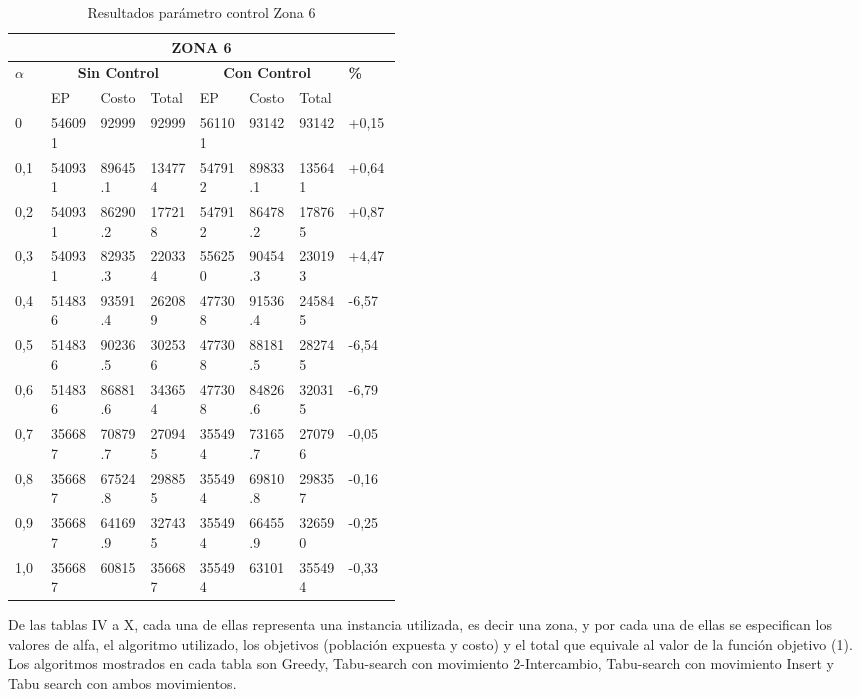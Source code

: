 \documentclass[conference]{IEEEtran}
\begin{document}
\begin{table*}[t]
\caption{Resultados par\'ametro control Zona 6}
\centering
\begin{tabular}{|p{0.03\linewidth}|p{0.06\linewidth}|p{0.06\linewidth}|p{0.06\linewidth}|p{0.06\linewidth}|p{0.06\linewidth}|p{0.06\linewidth}|p{0.06\linewidth}|}
\hline
\multicolumn{8}{|c|}{\textbf{ZONA 6}} \\ 
\hline

\multirow{2}{*}{\textbf{$\alpha$}}  & \multicolumn{3}{|c|}{\textbf{Sin Control}} & \multicolumn{3}{|c|}{\textbf{Con Control}} &  \multirow{2}{*}{\textbf{\%}} \\

\cline{2-7}
 & EP & Costo & Total & EP & Costo & Total &  \\
\hline
0 & 546091 & 92999 & 92999 & 561101 & 93142 & 93142 & +0,15 \\
\hline
0,1 & 540931 & 89645.1 & 134774 & 547912 & 89833.1 & 135641 & +0,64 \\ 
\hline
0,2 & 540931 & 86290.2 & 177218 & 547912 & 86478.2 & 178765 & +0,87 \\ 
\hline
0,3 & 540931 & 82935.3 & 220334 & 556250 & 90454.3 & 230193 & +4,47\\ 
\hline
0,4 & 514836 & 93591.4 & 262089 & 477308 & 91536.4 & 245845 & -6,57 \\ 
\hline
0,5 & 514836 & 90236.5 & 302536 & 477308 & 88181.5 & 282745 & -6,54\\ 
\hline
0,6 & 514836 & 86881.6 & 343654 & 477308 & 84826.6 & 320315 & -6,79\\ 
\hline
0,7 & 356687 & 70879.7 & 270945 & 355494 & 73165.7 & 270796 & -0,05\\ 
\hline
0,8 & 356687 & 67524.8 & 298855 & 355494 & 69810.8 & 298357 & -0,16\\ 
\hline
0,9 & 356687 & 64169.9 & 327435 & 355494 & 66455.9 & 326590 & -0,25 \\ 
\hline
1,0 & 356687 & 60815 & 356687 & 355494 & 63101 & 355494 & -0,33 \\ 
\hline

\end{tabular}
\end{table*}
\clearpage
De las tablas IV a X, cada una de ellas representa una instancia utilizada, es decir una zona, y por cada una de ellas se especifican los valores de alfa, el algoritmo utilizado, los objetivos (poblaci\'on expuesta y costo) y el total que equivale al valor de la funci\'on objetivo (1). Los algoritmos mostrados en cada tabla son Greedy, Tabu-search con movimiento 2-Intercambio, Tabu-search con movimiento Insert y Tabu search con ambos movimientos.
\end{document}
